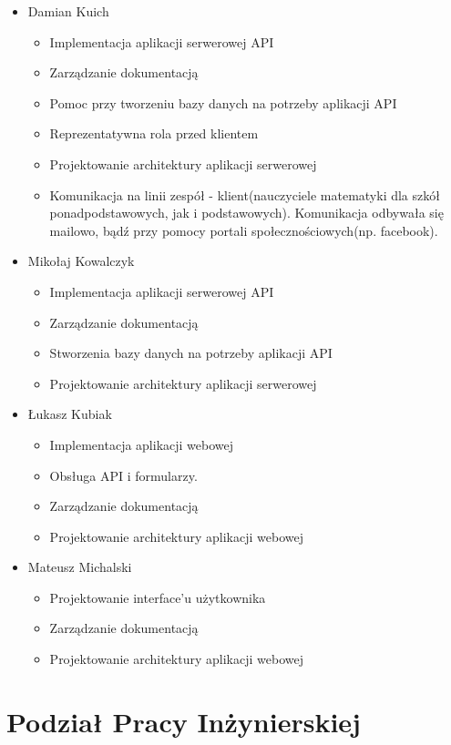 \documentclass[oneside,polski,logo,indent]{amuthesis}
\begin{document}
\begin{itemize}
\item Damian Kuich
\begin{itemize}
\item Implementacja aplikacji serwerowej API
\item Zarządzanie dokumentacją
\item Pomoc przy tworzeniu bazy danych na potrzeby aplikacji API
\item Reprezentatywna rola przed klientem
\item Projektowanie architektury aplikacji serwerowej
\item Komunikacja na linii zespół - klient(nauczyciele matematyki dla szkół ponadpodstawowych, jak i podstawowych). Komunikacja odbywała się mailowo, bądź przy pomocy portali społecznościowych(np. facebook).
\end{itemize}
\item Mikołaj Kowalczyk
\begin{itemize}
\item Implementacja aplikacji serwerowej API
\item Zarządzanie dokumentacją
\item Stworzenia bazy danych na potrzeby aplikacji API
\item Projektowanie architektury aplikacji serwerowej
\end{itemize}
\item Łukasz Kubiak
\begin{itemize}
\item Implementacja aplikacji webowej
\item Obsługa API i formularzy.
\item Zarządzanie dokumentacją
\item Projektowanie architektury aplikacji webowej
\end{itemize}
\item Mateusz Michalski
\begin{itemize}
\item Projektowanie interface’u użytkownika
\item Zarządzanie dokumentacją
\item Projektowanie architektury aplikacji webowej
\end{itemize}
\end{itemize}


\section{Podział Pracy Inżynierskiej}
\end{document}
